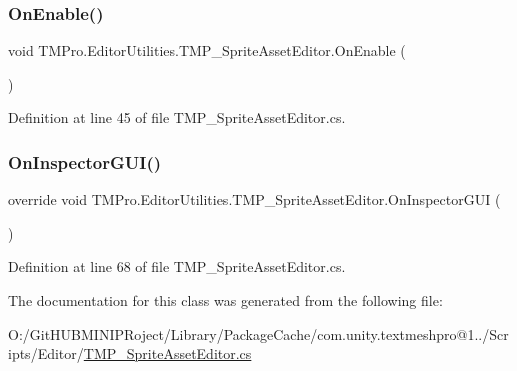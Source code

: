 \subsubsection{\texorpdfstring{OnEnable()}{OnEnable()}}
{\footnotesize\ttfamily void T\+M\+Pro.\+Editor\+Utilities.\+T\+M\+P\+\_\+\+Sprite\+Asset\+Editor.\+On\+Enable (\begin{DoxyParamCaption}{ }\end{DoxyParamCaption})}



Definition at line 45 of file T\+M\+P\+\_\+\+Sprite\+Asset\+Editor.\+cs.

\mbox{\label{class_t_m_pro_1_1_editor_utilities_1_1_t_m_p___sprite_asset_editor_a296eb60d2ec23a05512aa1ab4751e190}} 
\subsubsection{\texorpdfstring{OnInspectorGUI()}{OnInspectorGUI()}}
{\footnotesize\ttfamily override void T\+M\+Pro.\+Editor\+Utilities.\+T\+M\+P\+\_\+\+Sprite\+Asset\+Editor.\+On\+Inspector\+G\+UI (\begin{DoxyParamCaption}{ }\end{DoxyParamCaption})}



Definition at line 68 of file T\+M\+P\+\_\+\+Sprite\+Asset\+Editor.\+cs.



The documentation for this class was generated from the following file\+:\begin{DoxyCompactItemize}
\item 
O\+:/\+Git\+H\+U\+B\+M\+I\+N\+I\+P\+Roject/\+Library/\+Package\+Cache/com.\+unity.\+textmeshpro@1../\+Scripts/\+Editor/\mbox{\hyperlink{_t_m_p___sprite_asset_editor_8cs}{T\+M\+P\+\_\+\+Sprite\+Asset\+Editor.\+cs}}\end{DoxyCompactItemize}
